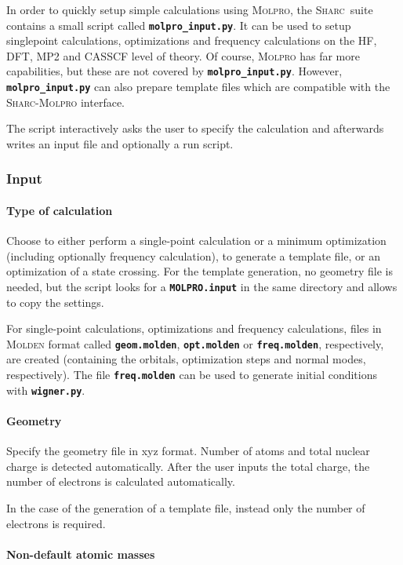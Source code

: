 \documentclass[a4paper,11pt,DIV=15,openany,twoside=false]{scrbook}
\newcommand{\sharc}{\textsc{Sharc}}
\newcommand{\ttt}[1]{\textbf{\texttt{#1}}}
\begin{document}
In order to quickly setup simple calculations using \textsc{Molpro}, the \sharc\ suite contains a small script called \ttt{molpro\_input.py}. It can be used to setup singlepoint calculations, optimizations and frequency calculations on the HF, DFT, MP2 and CASSCF level of theory. Of course, \textsc{Molpro} has far more capabilities, but these are not covered by \ttt{molpro\_input.py}. However, \ttt{molpro\_input.py} can also prepare template files which are compatible with the \sharc-\textsc{Molpro} interface.

The script interactively asks the user to specify the calculation and afterwards writes an input file and optionally a run script.

\subsubsection{Input}

\paragraph{Type of calculation}

Choose to either perform a single-point calculation or a minimum optimization (including optionally frequency calculation), to generate a template file, or an optimization of a state crossing. For the template generation, no geometry file is needed, but the script looks for a \ttt{MOLPRO.input} in the same directory and allows to copy the settings. 

For single-point calculations, optimizations and frequency calculations, files in \textsc{Molden} format called \ttt{geom.molden}, \ttt{opt.molden} or \ttt{freq.molden}, respectively, are created (containing the orbitals, optimization steps and normal modes, respectively). The file \ttt{freq.molden} can be used to generate initial conditions with \ttt{wigner.py}.

\paragraph{Geometry}

Specify the geometry file in xyz format. Number of atoms and total nuclear charge is detected automatically. After the user inputs the total charge, the number of electrons is calculated automatically.

In the case of the generation of a template file, instead only the number of electrons is required.

\paragraph{Non-default atomic masses}
\end{document}
